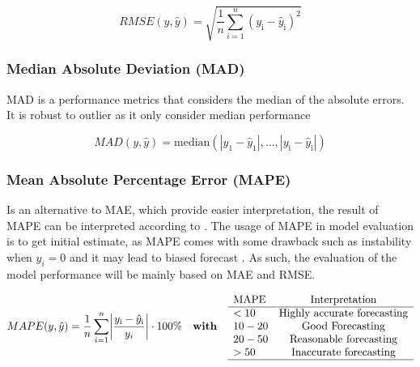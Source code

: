 \begin{equation}\label{eqn:RMSE}
    RMSE(y,\hat{y}) = \sqrt{\frac{1}{n}\sum_{i=1}^{n} (y_{\text{i}} - \hat{y}_{\text{i}})^2} 
\end{equation}

\subsubsection*{Median Absolute Deviation (MAD)}\label{sec:MAD} 

MAD is a performance metrics that considers the median of the absolute errors. It is robust to outlier as it only consider median performance

\begin{equation}\label{eqn:MAD}
    MAD(y,\hat{y}) =  \text{median} (|y_{\text{1}} - \hat{y}_{\text{1}}|,\dots,|y_{\text{i}} - \hat{y}_{\text{i}}|)
\end{equation}

\subsubsection*{Mean Absolute Percentage Error (MAPE)}

Is an alternative to MAE, which provide easier interpretation, the result of MAPE can be interpreted according to  . The usage of MAPE in model evaluation is to get initial estimate, as MAPE comes with some drawback such as instability when $y_i = 0$ and it may lead to biased forecast . As such, the evaluation of the model performance will be mainly based on MAE and RMSE.    

\begin{equation}\label{eqn:MAPE}
    MAPE(y,\hat{y}) = \frac{1}{n}\sum_{i=1}^{n} \biggl|\frac{y_{\text{i}} - \hat{y}_{\text{i}}}{y_i}\biggr| \cdot 100\%  \quad \textbf{with} \quad \begin{array}{l c}
        \text{MAPE} & \text{Interpretation}\\
        \hline
        < 10 & \text{Highly accurate forecasting} \\
        10-20 & \text{Good Forecasting} \\
        20-50 & \text{Reasonable forecasting}\\
        > 50 & \text{Inaccurate forecasting} \\
        \hline
    \end{array}
\end{equation}

